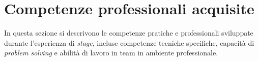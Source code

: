 \section{Competenze professionali acquisite}
In questa sezione si descrivono le competenze pratiche e professionali sviluppate durante l'esperienza di \textit{stage}, incluse competenze tecniche specifiche, capacità di \textit{problem solving} e abilità di lavoro in team in ambiente professionale.